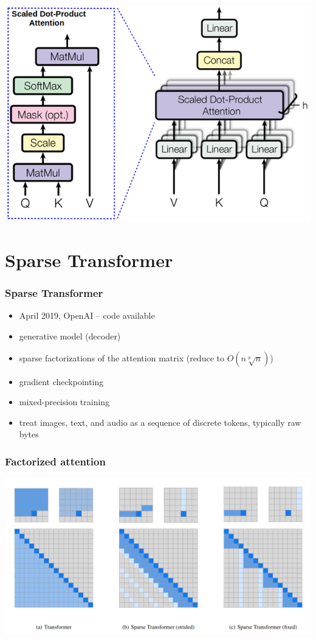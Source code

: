 \documentclass{beamer}
\begin{document}
\begin{frame}
\begin{center}
        \includegraphics[scale=0.4]{img/multi_head_attention.png}
    \end{center}
\end{frame}



\section{Sparse Transformer}
\begin{frame}
    \frametitle{Sparse Transformer \cite{sparse_transformer}}
    \begin{itemize}
        \item April 2019, OpenAI -- code available
        \item generative model (decoder)
        \item sparse factorizations of the attention matrix (reduce to $O(n  \sqrt[p]{n})$)
        \item gradient checkpointing
        \item mixed-precision training
        \item treat images, text, and audio as a sequence of discrete tokens, typically raw bytes
    \end{itemize}
\end{frame}

\begin{frame}
    \frametitle{Factorized attention}
    \begin{center}
        \includegraphics[scale=0.30]{img/sparse_transformer_attentions.png}
    \end{center}
\end{frame}
\end{document}
